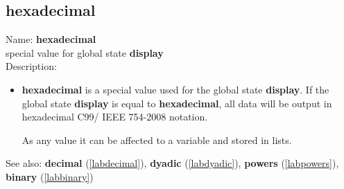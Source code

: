 \subsection{hexadecimal}
\label{labhexadecimal}
\noindent Name: \textbf{hexadecimal}\\
special value for global state \textbf{display}\\
\noindent Description: \begin{itemize}

\item \textbf{hexadecimal} is a special value used for the global state \textbf{display}.  If
   the global state \textbf{display} is equal to \textbf{hexadecimal}, all data will be
   output in hexadecimal C99/ IEEE 754-2008 notation.
    
   As any value it can be affected to a variable and stored in lists.
\end{itemize}
See also: \textbf{decimal} (\ref{labdecimal}), \textbf{dyadic} (\ref{labdyadic}), \textbf{powers} (\ref{labpowers}), \textbf{binary} (\ref{labbinary})
